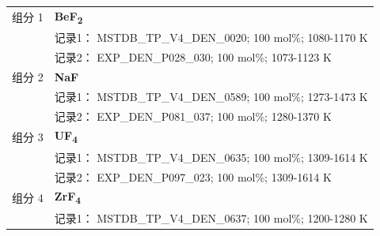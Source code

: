 \documentclass[12pt]{article}
\begin{document}
{\begin{longtable}[]{@{}
  >{\raggedright\arraybackslash}p{}
  >{\raggedright\arraybackslash}p{}@{}}
组分 1  & \textbf{BeF\textsubscript{2}} \\
 & 记录1： MSTDB\_TP\_V4\_DEN\_0020; 100 mol\%; 1080-1170 K \\
 & 记录2： EXP\_DEN\_P028\_030; 100 mol\%; 1073-1123 K  \\

组分 2  & \textbf{NaF} \\
 & 记录1： MSTDB\_TP\_V4\_DEN\_0589; 100 mol\%; 1273-1473 K \\
 & 记录2： EXP\_DEN\_P081\_037; 100 mol\%; 1280-1370 K  \\

组分 3  & \textbf{UF\textsubscript{4}} \\
 & 记录1： MSTDB\_TP\_V4\_DEN\_0635; 100 mol\%; 1309-1614 K \\
 & 记录2： EXP\_DEN\_P097\_023; 100 mol\%; 1309-1614 K  \\

组分 4  & \textbf{ZrF\textsubscript{4}} \\
 & 记录1： MSTDB\_TP\_V4\_DEN\_0637; 100 mol\%; 1200-1280 K  \\


\end{longtable}}
\end{document}
